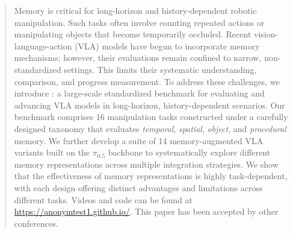 \begin{abstract}
Memory is critical for long-horizon and history-dependent robotic manipulation.
Such tasks often involve counting repeated actions or manipulating objects that become temporarily occluded.
Recent vision-language-action (VLA) models have begun to incorporate memory mechanisms; however, their evaluations remain confined to narrow, non-standardized settings. This limits their systematic understanding, comparison, and progress measurement.
To address these challenges, we introduce \textbf{\benchname}: a large-scale standardized benchmark for evaluating and advancing VLA models in long-horizon, history-dependent scenarios. Our benchmark comprises 16 manipulation tasks constructed under a carefully designed taxonomy that evaluates \textit{temporal}, \textit{spatial}, \textit{object}, and \textit{procedural} memory.
We further develop a suite of 14 memory-augmented VLA variants built on the $\pi_{0.5}$ backbone to systematically explore different memory representations across multiple integration strategies.
We show that the effectiveness of memory representations is highly task-dependent, with each design offering distinct advantages and limitations across different tasks.
Videos and code can be found at \url{https://anonymtest1.github.io/}.
This paper has been accepted by other conferences.
\end{abstract}
